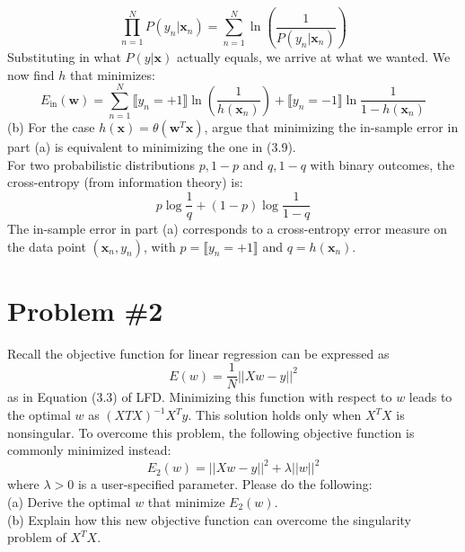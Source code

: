 \documentclass[12pt]{article}
\begin{document}
	\begin{equation*}
	\prod_{n=1}^{N} P(y_n|\boldsymbol{x}_n) = \sum_{n=1}^{N} \ln (\frac{1}{P(y_n|\boldsymbol{x}_n)})
	\end{equation*}
	Substituting in what $P(y|\boldsymbol{x})$ actually equals, we arrive at what we wanted. We now find $h$ that minimizes:
	\begin{equation*}
	E_{\text{in}}(\boldsymbol{w})= \sum_{n=1}^{N} \llbracket y_n=+1\rrbracket \ln(\frac{1}{h(\boldsymbol{x}_n)}) + \llbracket y_n=-1\rrbracket \ln \frac{1}{1-h(\boldsymbol{x}_n)}
	\end{equation*}
	(b) For the case $h(\boldsymbol{x}) = \theta (\boldsymbol{w}^T\boldsymbol{x})$, argue that minimizing the in-sample error in part (a) is equivalent to minimizing the one in (3.9).
	\\
	For two probabilistic distributions ${p, 1-p}$ and ${q, 1-q }$ with binary outcomes, the cross-entropy (from information theory) is:
	\begin{equation*}
		p\log\frac{1}{q} + (1-p)\log\frac{1}{1-q}
	\end{equation*}
	The in-sample error in part (a) corresponds to a cross-entropy error measure on the data point $(\boldsymbol{x}_n, y_n)$, with $p=\llbracket y_n=+1\rrbracket$ and $q=h(\boldsymbol{x}_n)$.
	\section*{Problem \#2}
	Recall the objective function for linear regression can be expressed as 
	\begin{equation*}
	E(w) = \frac{1}{N} ||Xw-y||^2
	\end{equation*}
	as in Equation (3.3) of LFD. Minimizing this function with respect to $w$ leads to the optimal
	$w$ as $(X T X)^{-1} X^T y$. This solution holds only when $X^TX$ is nonsingular. To overcome this problem, the following objective function is commonly minimized instead:
	\begin{equation*}
	E_2(w) = ||Xw-y||^2 + \lambda ||w||^2
	\end{equation*}
	where $\lambda > 0$ is a user-specified parameter. Please do the following: \\
	(a) Derive the optimal $w$ that minimize $E_2(w)$.\\
	(b) Explain how this new objective function can overcome the singularity problem
	of $X^T X$.
	
\end{document}

